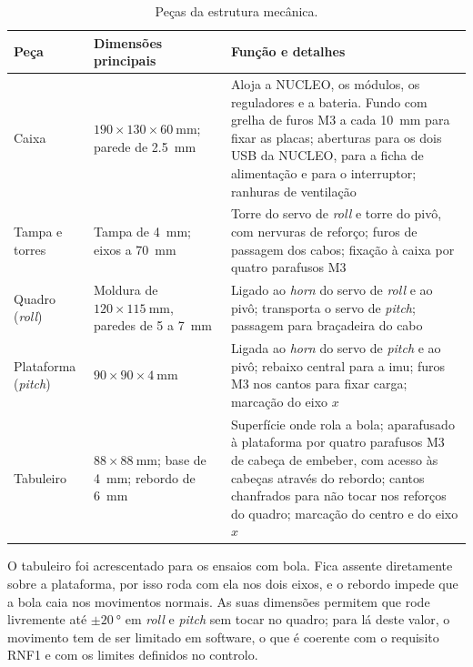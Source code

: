 \begin{table}[H]
\centering\small
\caption{Peças da estrutura mecânica.}
\begin{tabularx}{\textwidth}{>{\raggedright\arraybackslash}p{2.6cm}>{\raggedright\arraybackslash}p{3.4cm}Y}
\toprule
Peça & Dimensões principais & Função e detalhes\\\midrule
Caixa & $190\times130\times\SI{60}{\milli\metre}$; parede de \SI{2.5}{\milli\metre} & Aloja a NUCLEO, os módulos, os reguladores e a bateria. Fundo com grelha de furos M3 a cada \SI{10}{\milli\metre} para fixar as placas; aberturas para os dois USB da NUCLEO, para a ficha de alimentação e para o interruptor; ranhuras de ventilação\\
Tampa e torres & Tampa de \SI{4}{\milli\metre}; eixos a \SI{70}{\milli\metre} & Torre do servo de \textit{roll} e torre do pivô, com nervuras de reforço; furos de passagem dos cabos; fixação à caixa por quatro parafusos M3\\
Quadro (\textit{roll}) & Moldura de $120\times\SI{115}{\milli\metre}$, paredes de 5 a \SI{7}{\milli\metre} & Ligado ao \textit{horn} do servo de \textit{roll} e ao pivô; transporta o servo de \textit{pitch}; passagem para braçadeira do cabo\\
Plataforma (\textit{pitch}) & $90\times90\times\SI{4}{\milli\metre}$ & Ligada ao \textit{horn} do servo de \textit{pitch} e ao pivô; rebaixo central para a \acrshort{imu}; furos M3 nos cantos para fixar carga; marcação do eixo $x$\\
Tabuleiro & $88\times\SI{88}{\milli\metre}$; base de \SI{4}{\milli\metre}; rebordo de \SI{6}{\milli\metre} & Superfície onde rola a bola; aparafusado à plataforma por quatro parafusos M3 de cabeça de embeber, com acesso às cabeças através do rebordo; cantos chanfrados para não tocar nos reforços do quadro; marcação do centro e do eixo $x$\\
\bottomrule
\end{tabularx}
\label{tab:pecas}
\end{table}

O tabuleiro foi acrescentado para os ensaios com bola. Fica assente diretamente sobre a plataforma, por isso roda com ela nos dois eixos, e o rebordo impede que a bola caia nos movimentos normais. As suas dimensões permitem que rode livremente até $\pm\SI{20}{\degree}$ em \textit{roll} e \textit{pitch} sem tocar no quadro; para lá deste valor, o movimento tem de ser limitado em software, o que é coerente com o requisito RNF1 e com os limites definidos no controlo.

